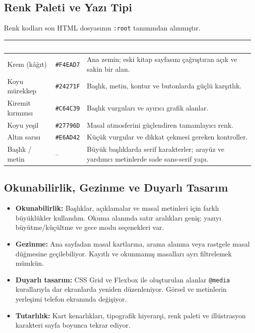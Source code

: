 \documentclass[12pt,a4paper]{article}
\begin{document}
\subsection{Renk Paleti ve Yazı Tipi}
Renk kodları son HTML dosyasının \texttt{:root} tanımından alınmıştır.
\begin{center}
\begin{tabular}{@{}p{3cm}p{2.5cm}p{7.7cm}@{}}
\toprule
\rowcolor{ana}\textcolor{white}{\textbf{Ad}} & \textcolor{white}{\textbf{Kod}} & \textcolor{white}{\textbf{Kullanım ve gerekçe}} \\
\midrule
Krem (kâğıt) & \texttt{\#F4EAD7} & Ana zemin; eski kitap sayfasını çağrıştıran açık ve sakin bir alan. \\
Koyu mürekkep & \texttt{\#24271F} & Başlık, metin, kontur ve butonlarda güçlü karşıtlık. \\
Kiremit kırmızısı & \texttt{\#C64C39} & Başlık vurguları ve ayırıcı grafik alanlar. \\
Koyu yeşil & \texttt{\#27796D} & Masal atmosferini güçlendiren tamamlayıcı renk. \\
Altın sarısı & \texttt{\#E6AD42} & Küçük vurgular ve dikkat çekmesi gereken kontroller. \\
Başlık / metin & -- & Büyük başlıklarda serif karakterler; arayüz ve yardımcı metinlerde sade sans-serif yapı. \\
\bottomrule
\end{tabular}
\end{center}

\subsection{Okunabilirlik, Gezinme ve Duyarlı Tasarım}
\begin{itemize}
\item \textbf{Okunabilirlik:} Başlıklar, açıklamalar ve masal metinleri için farklı büyüklükler kullandım. Okuma alanında satır aralıkları geniş; yazıyı büyütme/küçültme ve gece modu seçenekleri var.
\item \textbf{Gezinme:} Ana sayfadan masal kartlarına, arama alanına veya rastgele masal düğmesine geçilebiliyor. Kayıtlı ve okunmamış masalları ayrı filtrelemek mümkün.
\item \textbf{Duyarlı tasarım:} CSS Grid ve Flexbox ile oluşturulan alanlar \texttt{@media} kurallarıyla dar ekranlarda yeniden düzenleniyor. Görsel ve metinlerin yerleşimi telefon ekranında değişiyor.
\item \textbf{Tutarlılık:} Kart kenarlıkları, tipografik hiyerarşi, renk paleti ve illüstrasyon karakteri sayfa boyunca tekrar ediyor.
\end{itemize}
\end{document}
